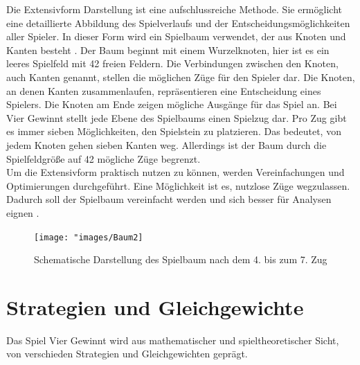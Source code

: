 Die Extensivform Darstellung ist eine aufschlussreiche Methode.
Sie ermöglicht eine detaillierte Abbildung des Spielverlaufs und der Entscheidungsmöglichkeiten aller Spieler.
In dieser Form wird ein Spielbaum verwendet, der aus Knoten und Kanten besteht \autocite{einsiedler2014spieltheorie}. 
Der Baum beginnt mit einem Wurzelknoten, hier ist es ein leeres Spielfeld mit 42 freien Feldern. Die Verbindungen zwischen den Knoten, auch Kanten genannt, stellen die möglichen Züge für den Spieler dar. Die Knoten, an denen Kanten zusammenlaufen, repräsentieren eine Entscheidung eines Spielers. Die Knoten am Ende zeigen mögliche Ausgänge für das Spiel an.
Bei Vier Gewinnt stellt jede Ebene des Spielbaums einen Spielzug dar. Pro Zug gibt es immer sieben Möglichkeiten, den Spielstein zu platzieren. Das bedeutet, von jedem Knoten gehen sieben Kanten weg. Allerdings ist der Baum durch die Spielfeldgröße auf 42 mögliche Züge begrenzt.\\
Um die Extensivform praktisch nutzen zu können, werden Vereinfachungen und Optimierungen durchgeführt. Eine Möglichkeit ist es, nutzlose Züge wegzulassen. Dadurch soll der Spielbaum vereinfacht werden und sich besser für Analysen eignen \autocite{ruile2009viergewinnt}.  
\begin{figure}[H]
	\centering
	\texttt{[image: "images/Baum2]}
	\caption[Spielbaum nach dem 4. Zug. Quelle: \cite{vandewiele2017}]{Schematische Darstellung des Spielbaum nach dem 4. bis zum 7. Zug}
	\label{fig:Baum2}
\end{figure}

\section{Strategien und Gleichgewichte}
Das Spiel Vier Gewinnt wird aus mathematischer und spieltheoretischer Sicht, von verschieden Strategien und Gleichgewichten geprägt.

